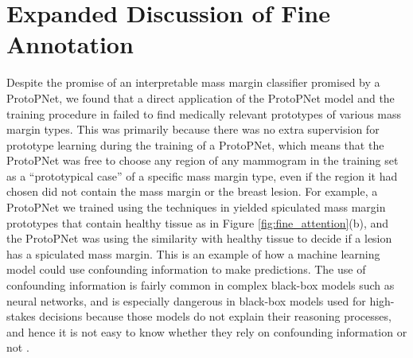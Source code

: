\documentclass[11pt]{article}
\begin{document}
\section{Expanded Discussion of Fine Annotation}
\label{app:fineannotation}
\FloatBarrier

Despite the promise of an interpretable mass margin classifier promised by a ProtoPNet, we found that a direct application of the ProtoPNet model and the training procedure in \cite{PPNet} failed to find medically relevant prototypes of various mass margin types. This was primarily because there was no extra supervision for prototype learning during the training of a ProtoPNet, which means that the ProtoPNet was free to choose any region of any mammogram in the training set as a ``prototypical case'' of a specific mass margin type, even if the region it had chosen did not contain the mass margin or the breast lesion. For example, a ProtoPNet we trained using the techniques in \cite{PPNet} yielded spiculated mass margin prototypes that contain healthy tissue as in Figure \ref{fig:fine_attention}(b), and the ProtoPNet was using the similarity with healthy tissue to decide if a lesion has a spiculated mass margin. This is an example of how a machine learning model could use confounding information to make predictions. The use of confounding information is fairly common in complex black-box models such as neural networks, and is especially dangerous in black-box models used for high-stakes decisions because those models do not explain their reasoning processes, and hence it is not easy to know whether they rely on confounding information or not \citep{rudin2019stop}.
\end{document}
